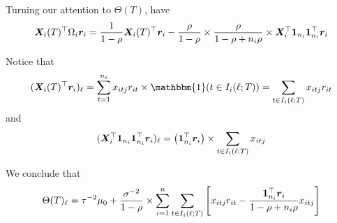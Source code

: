 \documentclass[11pt]{article}
\begin{document}
Turning our attention to $\Theta(T)$, have
$$
\bm{X}_{i}(T)^{\top}\Omega_{i}\bm{r}_{i} = \frac{1}{1-\rho}\bm{X}_{i}(T)^{\top}\bm{r}_{i} - \frac{\rho}{1-\rho} \times \frac{\rho}{1 - \rho + n_{i}\rho} \times \bm{X}_{i}^{\top}\boldsymbol{1}_{n_{i}}\boldsymbol{1}_{n_{i}}^{\top}\bm{r}_{i}
$$

Notice that
$$
(\bX_{i}(T)^{\top}\br_{i})_{\ell} = \sum_{t = 1}^{n_{i}}{x_{itj}r_{it}\times \mathbbm{1}(t \in I_{i}(\ell;T))} = \sum_{t \in I_{i}(\ell;T)}{x_{itj}r_{it}}
$$
and
$$
(\bm{X}_{i}^{\top}\boldsymbol{1}_{n_{i}}\boldsymbol{1}_{n_{i}}^{\top}\bm{r}_{i})_{\ell} = \left(\boldsymbol{1}_{n_{i}}^{\top}\bm{r}_{i}\right) \times \sum_{t \in I_{i}(\ell;T)}{x_{itj}}
$$

We conclude that
$$
\Theta(T)_{\ell} = \tau^{-2}\mu_{0} + \frac{\sigma^{-2}}{1 - \rho} \times \sum_{i = 1}^{n}{\sum_{t \in I_{i}(\ell;T)}{\left[x_{itj}r_{it} - \frac{\boldsymbol{1}_{n_{i}}^{\top}\bm{r}_{i}}{1 - \rho + n_{i}\rho}x_{itj}\right]}}
$$





\end{document}
